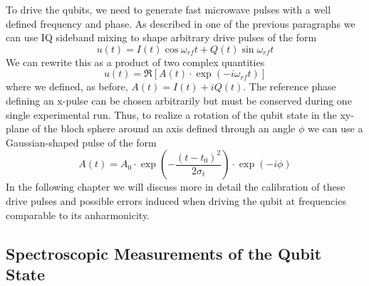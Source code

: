 To drive the qubits, we need to generate fast microwave pulses with a well defined frequency and phase. As described in one of the previous paragraphs we can use IQ sideband mixing to shape arbitrary drive pulses of the form
%
\begin{equation}
u(t) = I(t)\cos{\omega_{rf}t}+Q(t)\sin{\omega_{rf}t}
\end{equation}
%
We can rewrite this as a product of two complex quantities
%
\begin{equation}
u(t) = \Re\left[ A(t)\cdot\exp{\left(-i\omega_{rf} t\right)}\right]
\end{equation}
%
where we defined, as before, $A(t)=I(t)+iQ(t)$. The reference phase defining an x-pulse can be chosen arbitrarily but must be conserved during one single experimental run. Thus, to realize a rotation of the qubit state in the xy-plane of the bloch sphere around an axis defined through an angle $\phi$ we can use a Gaussian-shaped pulse of the form
%
\begin{equation}
A(t) = A_0\cdot\exp{\left(-\frac{(t-t_0)^2}{2\sigma_t}\right)}\cdot\exp{\left(-i\phi\right)}
\end{equation}
%
In the following chapter we will discuss more in detail the calibration of these drive pulses and possible errors induced when driving the qubit at frequencies comparable to its anharmonicity. 

\subsection{Spectroscopic Measurements of the Qubit State}

